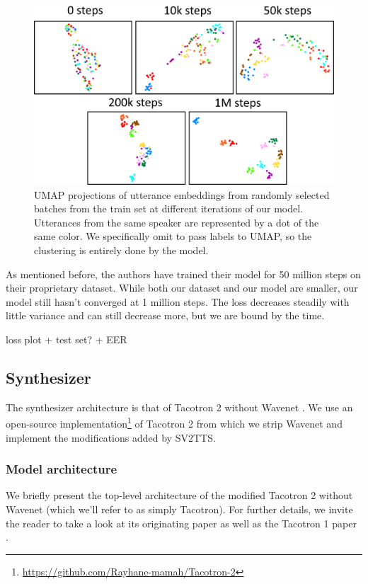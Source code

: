 \documentclass[a4paper, oneside, 12pt, english]{article}
\begin{document}
\begin{figure}[h]
	\centering
	\includegraphics[width=\linewidth]{images/training_umap.png}
	\caption{UMAP projections of utterance embeddings from randomly selected batches from the train set at different iterations of our model. Utterances from the same speaker are represented by a dot of the same color. We specifically omit to pass labels to UMAP, so the clustering is entirely done by the model.}
	\label{training_umap}
\end{figure}

As mentioned before, the authors have trained their model for 50 million steps on their proprietary dataset. While both our dataset and our model are smaller, our model still hasn't converged at 1 million steps. The loss decreases steadily with little variance and can still decrease more, but we are bound by the time.

\color{red} loss plot + test set? + EER \color{black}



\subsection{Synthesizer} \label{synthesizer}
The synthesizer architecture is that of Tacotron 2 without Wavenet \citep{WaveNet}. We use an open-source implementation\footnote{\url{https://github.com/Rayhane-mamah/Tacotron-2}} of Tacotron 2 from which we strip Wavenet and implement the modifications added by SV2TTS.

\subsubsection{Model architecture}
We briefly present the top-level architecture of the modified Tacotron 2 without Wavenet (which we'll refer to as simply Tacotron). For further details, we invite the reader to take a look at its originating paper \cite{Tacotron2} as well as the Tacotron 1 paper \citep{Tacotron1}.
\end{document}
